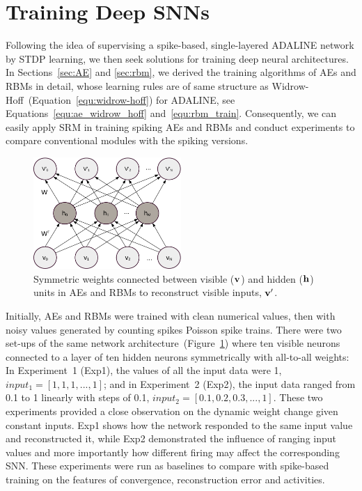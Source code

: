 \section{Training Deep SNNs}
\label{sec:dSNN}
Following the idea of supervising a spike-based, single-layered ADALINE network by STDP learning, we then seek solutions for training deep neural architectures.
In Sections~\ref{sec:AE} and \ref{sec:rbm}, we \protect{} derived the training algorithms of AEs and RBMs in detail, whose learning rules are of \protect{} same structure as Widrow-Hoff~(Equation~\ref{equ:widrow-hoff}) for ADALINE, see Equations~\ref{equ:ae_widrow_hoff} and~\ref{equ:rbm_train}.
Consequently, we can easily apply SRM in training spiking AEs and RBMs and conduct experiments to compare conventional \protect{} \protect{} modules with the spiking versions.

\begin{figure}
	\centering
	\includegraphics[width=0.5\textwidth]{pics_sdlm/AE.pdf}
	\caption{Symmetric weights connected between visible ($\bf{v}$) and hidden ($\bf{h}$) units in AEs and RBMs to reconstruct visible inputs, $\bf{v'}$.}
	\label{fig:sym_conn}
\end{figure}
Initially, AEs and RBMs were trained with clean numerical values, then with noisy values generated by counting \protect{} spikes \protect{} \protect{} Poisson spike trains.
There were two set-ups of the same network architecture~(Figure~\ref{fig:sym_conn}) where ten visible neurons connected to a layer of ten hidden neurons symmetrically with all-to-all weights: In Experiment~1 (Exp1), the values of all the input data were 1, $input_1 = [1, 1, 1,...,1]$; and in Experiment~2 (Exp2), the input data ranged from 0.1 to 1 linearly with steps of 0.1, $input_2 = [0.1, 0.2, 0.3,...,1]$.
These two experiments provided a close observation on the dynamic weight change given constant inputs.
Exp1 shows how the network responded to the same input value and reconstructed it, while Exp2 demonstrated the influence of ranging input values and more importantly how different firing \protect{} \protect{} may affect the corresponding SNN.
These experiments were run as baselines to compare with spike-based training on the features of \protect{} \protect{} convergence, reconstruction error and \protect{} \protect{} activities.

